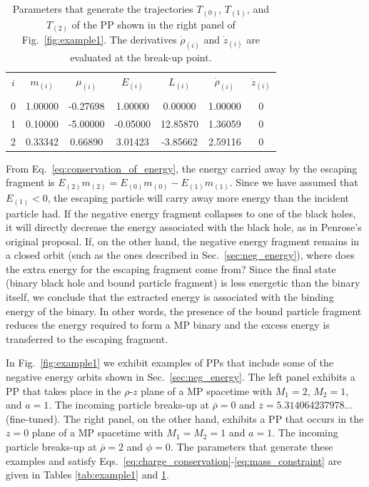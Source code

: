 \begin{table}[h]
  \centering
  \begin{tabular}{ccccccc}
    \hline\hline
    $i$ & $m_{(i)}$ & $\mu_{(i)}$ & $E_{(i)}$ & $L_{(i)}$ & $\dot{\rho}_{(i)}$ & $\dot{z}_{(i)}$ \\ \vspace{-0.3cm} \\
    0   & 1.00000   & -0.27698    & 1.00000   & 0.00000   & 1.00000            & 0               \\
    1   & 0.10000   & -5.00000    & -0.05000  & 12.85870  & 1.36059            & 0               \\
    2   & 0.33342   & 0.66890     & 3.01423   & -3.85662  & 2.59116            & 0               \\
    \hline\hline
  \end{tabular}
  \caption{Parameters that generate the trajectories $T_{(0)}$, $T_{(1)}$, and $T_{(2)}$ of the \ac{PP} shown in the right panel of Fig.~\ref{fig:example1}. The derivatives $\dot{\rho}_{(i)}$ and $\dot{z}_{(i)}$ are evaluated at the break-up point.}
  \label{tab:example2}
\end{table}

From Eq.~\eqref{eq:conservation_of_energy}, the energy carried away by the escaping fragment is $E_{(2)}m_{(2)} = E_{(0)}m_{(0)} - E_{(1)}m_{(1)}$. Since we have assumed that $E_{(1)} < 0$, the escaping particle will carry away more energy than the incident particle had. If the negative energy fragment collapses to one of the black holes, it will directly decrease the energy associated with the black hole, as in Penrose's original proposal. If, on the other hand, the negative energy fragment remains in a closed orbit (such as the ones described in Sec.~\ref{sec:neg_energy}), where does the extra energy for the escaping fragment come from? Since the final state (binary black hole and bound particle fragment) is less energetic than the binary itself, we conclude that the extracted energy is associated with the binding energy of the binary. In other words, the presence of the bound particle fragment reduces the energy required to form a \ac{MP} binary and the excess energy is transferred to the escaping fragment.


In Fig.~\ref{fig:example1} we exhibit examples of PPs that include some of the negative energy orbits shown in Sec.~\ref{sec:neg_energy}. The left panel exhibits a \ac{PP} that takes place in the $\rho$-$z$ plane of a \ac{MP} spacetime with $M_1=2$, $M_2=1$, and $a=1$. The incoming particle breaks-up at $\overline \rho=0$ and $\overline z = 5.314064237978...$ (fine-tuned). The right panel, on the other hand,  exhibits a \ac{PP} that occurs in the $z=0$ plane of a \ac{MP} spacetime with $M_1=M_2=1$ and $a=1$. The incoming particle breaks-up at $\overline \rho=2$ and $\phi = 0$. The parameters that generate these examples and satisfy Eqs.~\eqref{eq:charge_conservation}-\eqref{eq:mass_constraint} are given in Tables \ref{tab:example1} and \ref{tab:example2}.


